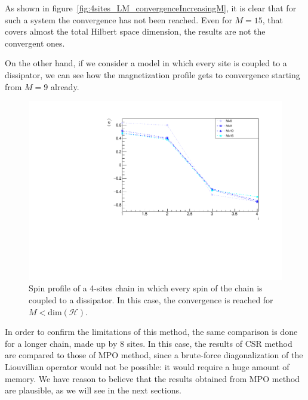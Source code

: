 As shown in figure~\ref{fig:4sites_LM_convergenceIncreasingM}, it is clear that for such a system the convergence has not been reached. Even for $M = 15$, that covers almost the total Hilbert space dimension, the results are not the convergent ones.

On the other hand, if we consider a model in which every site is coupled to a dissipator, we can see how the magnetization profile gets to convergence starting from $M = 9$ already.


\begin{figure}[H]
    \centering
    \includegraphics[scale=0.7]{Figures/4sites/4sites_totalDissipators.pdf}
    \caption{Spin profile of a 4-sites chain in which every spin of the chain is coupled to a dissipator. In this case, the convergence is reached for $M<\text{dim}(\mathcal{H})$.}
    \label{fig:4sites_totalDissipators}
\end{figure}

In order to confirm the limitations of this method, the same comparison is done for a longer chain, made up by 8 sites. In this case, the results of CSR method are compared to those of MPO method, since a brute-force diagonalization of the Liouvillian operator would not be possible: it would require a huge amount of memory. We have reason to believe that the results obtained from MPO method are plausible, as we will see in the next sections.

